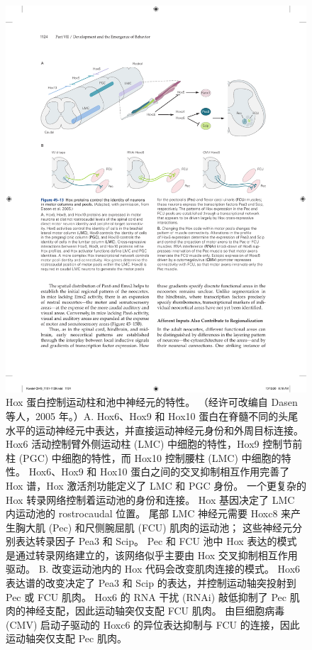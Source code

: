 \begin{figure}[htbp]
	\centering
	\includegraphics[width=0.95\linewidth]{chap45/fig_45_13}
	\caption{Hox 蛋白控制运动柱和池中神经元的特性。 （经许可改编自 Dasen 等人，2005 年。）A. Hox6、Hox9 和 Hox10 蛋白在脊髓不同的头尾水平的运动神经元中表达，并直接运动神经元身份和外周目标连接。 Hox6 活动控制臂外侧运动柱 (LMC) 中细胞的特性，Hox9 控制节前柱 (PGC) 中细胞的特性，而 Hox10 控制腰柱 (LMC) 中细胞的特性。 Hox6、Hox9 和 Hox10 蛋白之间的交叉抑制相互作用完善了 Hox 谱，Hox 激活剂功能定义了 LMC 和 PGC 身份。 一个更复杂的 Hox 转录网络控制着运动池的身份和连接。 Hox 基因决定了 LMC 内运动池的 rostrocaudal 位置。 尾部 LMC 神经元需要 Hoxc8 来产生胸大肌 (Pec) 和尺侧腕屈肌 (FCU) 肌肉的运动池； 这些神经元分别表达转录因子 Pea3 和 Scip。 Pec 和 FCU 池中 Hox 表达的模式是通过转录网络建立的，该网络似乎主要由 Hox 交叉抑制相互作用驱动。 B. 改变运动池内的 Hox 代码会改变肌肉连接的模式。 Hox6 表达谱的改变决定了 Pea3 和 Scip 的表达，并控制运动轴突投射到 Pec 或 FCU 肌肉。 Hox6 的 RNA 干扰 (RNAi) 敲低抑制了 Pec 肌肉的神经支配，因此运动轴突仅支配 FCU 肌肉。 由巨细胞病毒 (CMV) 启动子驱动的 Hoxc6 的异位表达抑制与 FCU 的连接，因此运动轴突仅支配 Pec 肌肉。}
	\label{fig:45_13}
\end{figure}



